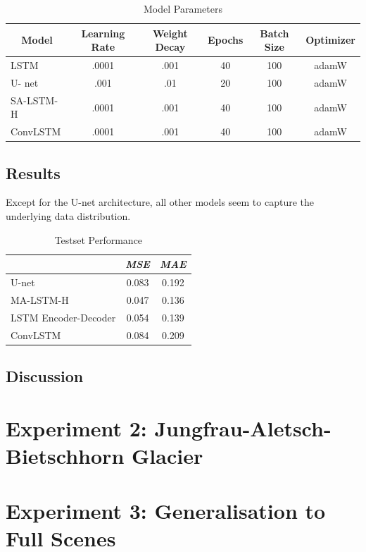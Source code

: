\documentclass[12pt]{article}
\begin{document}
\begin{table}[h]
	\caption{Model Parameters}
	\label{modelPars1}
	\begin{tabular}{lccccc}
		\toprule
		\multicolumn{1}{c}{\textbf{Model}} & \textbf{Learning Rate} & \textbf{Weight Decay} & \textbf{Epochs} & \textbf{Batch Size} & \textbf{Optimizer} \\ 
		\midrule
		LSTM & .0001 & .001 & 40 & 100 & adamW \\
		U- net & .001 & .01 & 20 & 100 & adamW \\
		SA-LSTM-H & .0001 & .001 & 40 & 100 & adamW \\
		ConvLSTM & .0001 & .001 & 40 & 100 & adamW \\
		\bottomrule
	\end{tabular}
\end{table}

\subsection{Results}
Except for the U-net architecture, all other models seem to capture the underlying data distribution. 

\begin{table}[htbp]
	\caption{Testset Performance}
	\begin{tabular}{lcc}
		\toprule
		& \multicolumn{1}{c}{\textit{MSE}} & \multicolumn{1}{c}{\textit{MAE}} \\
		\midrule
		U-net & 0.083 & 0.192 \\
		MA-LSTM-H & 0.047 & 0.136 \\
		LSTM Encoder-Decoder & 0.054 & 0.139 \\
		ConvLSTM & 0.084 & 0.209 \\
		\bottomrule
	\end{tabular}%
	\label{tab:performance_estimations}%
\end{table}%


\subsection{Discussion}

\section{Experiment 2: Jungfrau-Aletsch-Bietschhorn Glacier}

\section{Experiment 3: Generalisation to Full Scenes}
\end{document}
